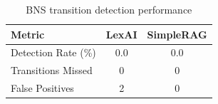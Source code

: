 \begin{table}[ht]
\centering
\caption{BNS transition detection performance}
\label{tab:bns_transitions}
\begin{tabular}{lcc}
\toprule
\textbf{Metric} & \textbf{LexAI} & \textbf{SimpleRAG} \\
\midrule
Detection Rate (\%) & 0.0 & 0.0 \\
Transitions Missed & 0 & 0 \\
False Positives & 2 & 0 \\
\bottomrule
\end{tabular}
\end{table}